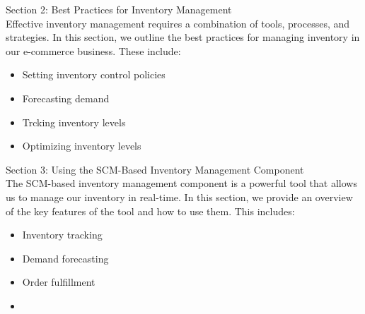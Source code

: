 \documentclass[12pt]{article}
\begin{document}
\begin{enumerate}
\begin{enumerate}
Section 2: Best Practices for Inventory Management\\
Effective inventory management requires a combination of tools, processes, and strategies. In this section, we outline the best practices for managing inventory in our e-commerce business. These include:
\begin{itemize}
    \item Setting inventory control policies
    \item Forecasting demand
    \item Trcking inventory levels
    \item Optimizing inventory levels
\end{itemize}

Section 3: Using the SCM-Based Inventory Management Component\\
The SCM-based inventory management component is a powerful tool that allows us to manage our inventory in real-time. In this section, we provide an overview of the key features of the tool and how to use them. This includes:
\begin{itemize}
    \item Inventory tracking
    \item Demand forecasting
    \item Order fulfillment
    \item 
\end{itemize}


\end{enumerate}
\end{enumerate}
\end{document}

